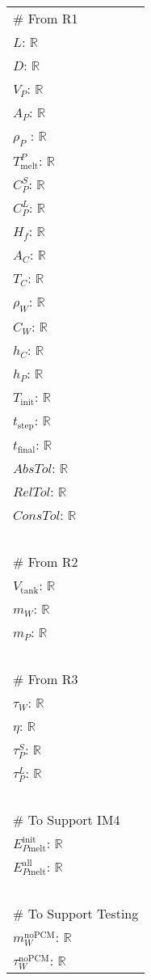 \documentclass[12pt, titlepage]{article}
\begin{document}
\renewcommand{\arraystretch}{1.2}
\begin{longtable*}[l]{l} 
\# From R1\\
$L$: $\mathbb{R}$ \\
$D$: $\mathbb{R}$ \\
$V_P$: $\mathbb{R}$ \\
$A_P$: $\mathbb{R}$ \\
$\rho_P$ : $\mathbb{R}$ \\
$T_\text{melt}^{P}$: $\mathbb{R}$ \\
$C^S_P$: $\mathbb{R}$ \\
$C^L_P$: $\mathbb{R}$ \\
$H_f$: $\mathbb{R}$ \\
$A_C$: $\mathbb{R}$ \\
$T_C$: $\mathbb{R}$ \\
$\rho_W$: $\mathbb{R}$ \\
$C_W$: $\mathbb{R}$ \\
$h_C$: $\mathbb{R}$ \\
$h_P$: $\mathbb{R}$ \\
$T_\text{init}$: $\mathbb{R}$ \\
$t_\text{step}$: $\mathbb{R}$ \\
$t_\text{final}$: $\mathbb{R}$ \\
$\mathit{AbsTol}$: $\mathbb{R}$ \\
$\mathit{RelTol}$: $\mathbb{R}$ \\
$\mathit{ConsTol}$: $\mathbb{R}$ \\
~\\
\# From R2\\
$V_\text{tank}$: $\mathbb{R}$ \\
$m_W$: $\mathbb{R}$ \\
$m_P$: $\mathbb{R}$ \\
~\\
\noindent \# From R3\\
$\tau_W$: $\mathbb{R}$ \\
$\eta$: $\mathbb{R}$ \\
$\tau_P^S$: $\mathbb{R}$ \\
$\tau_P^L$: $\mathbb{R}$ \\
~\\
\# To Support IM4\\
$E_{P\text{melt}}^{\text{init}}$: $\mathbb{R}$ \\
$E_{P\text{melt}}^{\text{all}}$: $\mathbb{R}$ \\ 
~\\
\# To Support Testing\\
$m_W^{\text{noPCM}}$: $\mathbb{R}$ \\
$\tau_W^{\text{noPCM}}$: $\mathbb{R}$\\
\end{longtable*}
\end{document}
